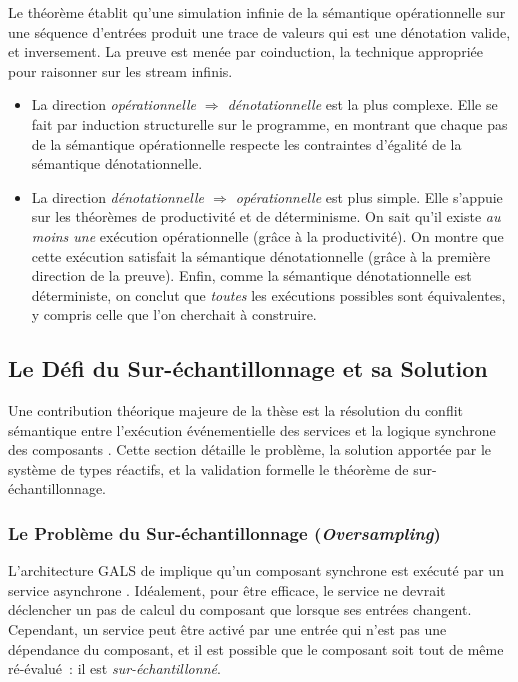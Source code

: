 Le théorème établit qu'une simulation infinie de la sémantique opérationnelle sur une séquence
d'entrées produit une trace de valeurs qui est une dénotation valide, et inversement.
%
La preuve est menée par coinduction, la technique appropriée pour raisonner sur les stream infinis.
\begin{itemize}
      \item La direction \emph{opérationnelle $\Rightarrow$ dénotationnelle} est la plus complexe.
            Elle se fait par induction structurelle sur le programme, en montrant que chaque pas de
            la sémantique opérationnelle respecte les contraintes d'égalité de la sémantique
            dénotationnelle.

      \item La direction \emph{dénotationnelle $\Rightarrow$ opérationnelle} est plus simple. Elle
            s'appuie sur les théorèmes de productivité et de déterminisme. On sait qu'il existe
            \emph{au moins une} exécution opérationnelle (grâce à la productivité). On montre que
            cette exécution satisfait la sémantique dénotationnelle (grâce à la première direction
            de la preuve). Enfin, comme la sémantique dénotationnelle est déterministe, on conclut
            que \emph{toutes} les exécutions possibles sont équivalentes, y compris celle que l'on
            cherchait à construire.
\end{itemize}

\subsection{Le Défi du Sur-échantillonnage et sa Solution}

Une contribution théorique majeure de la thèse est la résolution du conflit sémantique entre
l'exécution événementielle des services \GRFRP et la logique synchrone des composants \GRSync. Cette
section détaille le problème, la solution apportée par le système de types réactifs, et la
validation formelle \via le théorème de sur-échantillonnage.

\subsubsection{Le Problème du Sur-échantillonnage (\textit{Oversampling})}

L'architecture GALS de \GRust implique qu'un composant synchrone \GRSync est exécuté par un service
asynchrone \GRFRP. Idéalement, pour être efficace, le service ne devrait déclencher un pas de calcul
du composant que lorsque ses entrées changent. Cependant, un service peut être activé par une entrée
qui n'est pas une dépendance du composant, et il est possible que le composant soit tout de même
ré-évalué~: il est \emph{sur-échantillonné}.

